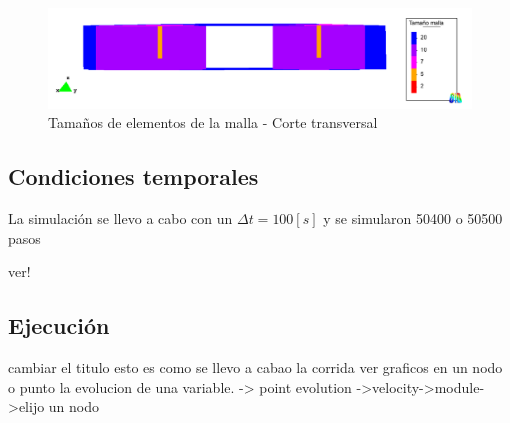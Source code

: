 \documentclass[10pt,a4paper,final]{article}
\begin{document}
\begin{figure}[tbhp]
\centerline{\includegraphics[scale=0.50]{img/tam_malla_pozo_interior}}
\caption{Tamaños de elementos de la malla - Corte transversal}
\label{tam_malla_pozo_interior}
\end{figure}
\subsection{Condiciones temporales}
La simulación se llevo a cabo con un $\Delta t = 100 \left[s\right]$ y se simularon 50400 o 50500 pasos \begin{Large}
ver!\\
\end{Large}
%
\subsection{Ejecución}
cambiar el titulo esto es como se llevo a cabao la corrida
ver graficos en un nodo o punto la evolucion de una variable. -> point evolution ->velocity->module->elijo un nodo
\end{document}

